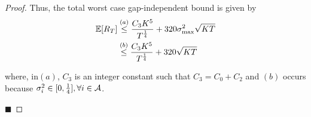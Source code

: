 \begin{proof}
Thus, the total worst case gap-independent bound is given by
	\begin{align*}
	\mathbb{E}[R_{T}] &\overset{(a)}{\leq}  \dfrac{C_3 K^5}{T^{\frac{1}{4}}} + 320\sigma_{\max}^2\sqrt{KT}\\
	&\overset{(b)}{\leq} \dfrac{C_3 K^5}{T^{\frac{1}{4}}} + 320\sqrt{KT}
	\end{align*}	
	
where, in$(a)$, $C_3$ is an integer constant such that $C_3 = C_0 + C_2 $ and $(b)$ occurs because $\sigma_i^2 \in [0,\frac{1}{4}], \forall i\in \mathcal{A}$.

\hfill $\blacksquare$	
\end{proof}